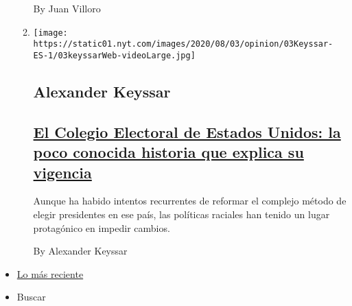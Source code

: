 \begin{enumerate}
\begin{enumerate}
    By Juan Villoro
  \item
    \texttt{[image: https://static01.nyt.com/images/2020/08/03/opinion/03Keyssar-ES-1/03keyssarWeb-videoLarge.jpg]}

    \hypertarget{alexander-keyssar}{%
    \subsection{Alexander Keyssar}\label{alexander-keyssar}}

    \hypertarget{el-colegio-electoral-de-estados-unidos-la-poco-conocida-historia-que-explica-su-vigencia}{%
    \subsection{\texorpdfstring{\href{/es/2020/08/03/espanol/opinion/colegio-electoral-estados-unidos.html}{El
    Colegio Electoral de Estados Unidos: la poco conocida historia que
    explica su
    vigencia}}{El Colegio Electoral de Estados Unidos: la poco conocida historia que explica su vigencia}}\label{el-colegio-electoral-de-estados-unidos-la-poco-conocida-historia-que-explica-su-vigencia}}

    Aunque ha habido intentos recurrentes de reformar el complejo método
    de elegir presidentes en ese país, las políticas raciales han tenido
    un lugar protagónico en impedir cambios.

    By Alexander Keyssar
  \end{enumerate}
\end{enumerate}

\begin{itemize}
\tightlist
\item
  \protect\hyperlink{stream-panel}{Lo más reciente}
\item
  Buscar
\end{itemize}

